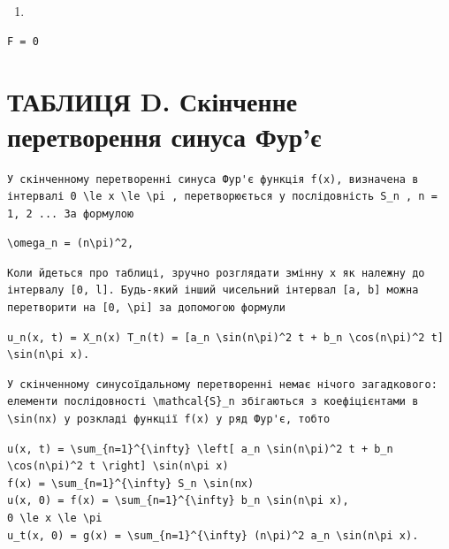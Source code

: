 \documentclass[
  ukrainian,
]{article}
\providecommand{\tightlist}{%
  \setlength{\itemsep}{0pt}\setlength{\parskip}{0pt}}
\begin{document}
\begin{enumerate}
\def\labelenumi{\arabic{enumi}.}
\tightlist
\item
\end{enumerate}

\begin{verbatim}
F = 0
\end{verbatim}

\section{ТАБЛИЦЯ D. Скінченне перетворення синуса
Фур'є}\label{ux442ux430ux431ux43bux438ux446ux44f-d.-ux441ux43aux456ux43dux447ux435ux43dux43dux435-ux43fux435ux440ux435ux442ux432ux43eux440ux435ux43dux43dux44f-ux441ux438ux43dux443ux441ux430-ux444ux443ux440ux454}

\begin{verbatim}
У скінченному перетворенні синуса Фур'є функція f(x), визначена в інтервалі 0 \le x \le \pi , перетворюється у послідовність S_n , n = 1, 2 ... За формулою
\end{verbatim}

\begin{verbatim}
\omega_n = (n\pi)^2,
\end{verbatim}

\begin{verbatim}
Коли йдеться про таблиці, зручно розглядати змінну x як належну до інтервалу [0, l]. Будь-який інший чисельний інтервал [a, b] можна перетворити на [0, \pi] за допомогою формули
\end{verbatim}

\begin{verbatim}
u_n(x, t) = X_n(x) T_n(t) = [a_n \sin(n\pi)^2 t + b_n \cos(n\pi)^2 t] \sin(n\pi x).
\end{verbatim}

\begin{verbatim}
У скінченному синусоїдальному перетворенні немає нічого загадкового: елементи послідовності \mathcal{S}_n збігаються з коефіцієнтами в \sin(nx) у розкладі функції f(x) у ряд Фур'є, тобто
\end{verbatim}

\begin{verbatim}
u(x, t) = \sum_{n=1}^{\infty} \left[ a_n \sin(n\pi)^2 t + b_n \cos(n\pi)^2 t \right] \sin(n\pi x)
f(x) = \sum_{n=1}^{\infty} S_n \sin(nx)
u(x, 0) = f(x) = \sum_{n=1}^{\infty} b_n \sin(n\pi x),
0 \le x \le \pi
u_t(x, 0) = g(x) = \sum_{n=1}^{\infty} (n\pi)^2 a_n \sin(n\pi x).
\end{verbatim}
\end{document}
